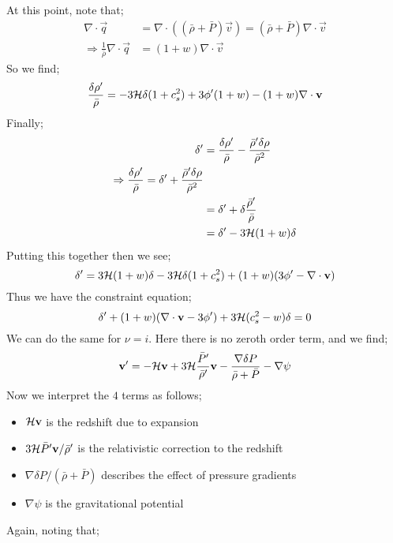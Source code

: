At this point, note that;
\begin{align*}
\nabla\cdot\vec{q} &= \nabla \cdot\left((\bar{\rho} + \bar{P})\vec{v}\right) = (\bar{\rho} + \bar{P})\nabla\cdot\vec{v} \\
\Rightarrow \frac{1}{\bar{\rho}}\nabla\cdot\vec{q} &= (1 + w)\nabla\cdot\vec{v}
\end{align*}
So we find;
\begin{equation*}
\frac{\delta \rho^{\prime}}{\bar{\rho}} = -3\mathcal{H} \delta (1 + c_s^2) + 3\phi^{\prime}(1 + w)- (1 + w)\nabla\cdot\mathbf{v}
\end{equation*}
Finally;
\begin{align*}
\delta^{\prime} &= \frac{\delta \rho^{\prime}}{\bar{\rho}} - \frac{\bar{\rho}^{\prime} \delta \rho}{\bar{\rho}^2} \\
\Rightarrow \frac{\delta \rho^{\prime}}{\bar{\rho}} = \delta^{\prime} + \frac{\bar{\rho}^{\prime} \delta \rho}{\bar{\rho}^2} \\
&= \delta^{\prime} + \delta \frac{\bar{\rho}^{\prime}}{\bar{\rho}} \\
&= \delta^{\prime} - 3\mathcal{H}(1+ w) \delta 
\end{align*}
Putting this together then we see;
\begin{equation*}
\delta^{\prime} = 3\mathcal{H}(1 + w)\delta - 3\mathcal{H} \delta(1 + c_s^2) + (1 + w)(3\phi^{\prime} - \nabla\cdot\mathbf{v})
\end{equation*}
Thus we have the constraint equation;
\begin{equation}
\delta^{\prime} + (1 + w)(\nabla\cdot\mathbf{v} - 3\phi^{\prime}) + 3\mathcal{H}(c_s^2 - w)\delta = 0
\end{equation}
We can do the same for $\nu = i$. Here there is no zeroth order term, and we find;
\begin{equation*}
\mathbf{v}^{\prime} = -\mathcal{H} \mathbf{v} + 3\mathcal{H} \frac{\bar{P}^{\prime}}{\bar{\rho}^{\prime}}\mathbf{v} - \frac{\nabla \delta P}{\bar{\rho} + \bar{P}} - \nabla \psi
\end{equation*}
Now we interpret the $4$ terms as follows;
\begin{itemize}
\item $\mathcal{H} \mathbf{v}$ is the redshift due to expansion
\item $3\mathcal{H} \bar{P}^{\prime} \mathbf{v}/\bar{\rho}^{\prime}$ is the relativistic correction to the redshift
\item $\nabla \delta P / (\bar{\rho} + \bar{P})$ describes the effect of pressure gradients
\item $\nabla \psi$ is the gravitational potential
\end{itemize}
Again, noting that;
